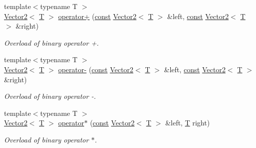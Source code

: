 \begin{DoxyCompactItemize}
{\footnotesize template$<$typename T $>$ }\\\hyperlink{classsf_1_1_vector2}{Vector2}$<$ \hyperlink{curses_8priv_8h_a5ef253115820acf7d27f3c5c3b02a0f0}{T} $>$ \hyperlink{classsf_1_1_vector2_a72421239823c38a6b780c86a710ead07}{operator+} (\hyperlink{term__entry_8h_a57bd63ce7f9a353488880e3de6692d5a}{const} \hyperlink{classsf_1_1_vector2}{Vector2}$<$ \hyperlink{curses_8priv_8h_a5ef253115820acf7d27f3c5c3b02a0f0}{T} $>$ \&left, \hyperlink{term__entry_8h_a57bd63ce7f9a353488880e3de6692d5a}{const} \hyperlink{classsf_1_1_vector2}{Vector2}$<$ \hyperlink{curses_8priv_8h_a5ef253115820acf7d27f3c5c3b02a0f0}{T} $>$ \&right)
\begin{DoxyCompactList}\small\item\em Overload of binary operator +. \end{DoxyCompactList}\item 
{\footnotesize template$<$typename T $>$ }\\\hyperlink{classsf_1_1_vector2}{Vector2}$<$ \hyperlink{curses_8priv_8h_a5ef253115820acf7d27f3c5c3b02a0f0}{T} $>$ \hyperlink{classsf_1_1_vector2_ad027adae53ec547a86c20deeb05c9e85}{operator-\/} (\hyperlink{term__entry_8h_a57bd63ce7f9a353488880e3de6692d5a}{const} \hyperlink{classsf_1_1_vector2}{Vector2}$<$ \hyperlink{curses_8priv_8h_a5ef253115820acf7d27f3c5c3b02a0f0}{T} $>$ \&left, \hyperlink{term__entry_8h_a57bd63ce7f9a353488880e3de6692d5a}{const} \hyperlink{classsf_1_1_vector2}{Vector2}$<$ \hyperlink{curses_8priv_8h_a5ef253115820acf7d27f3c5c3b02a0f0}{T} $>$ \&right)
\begin{DoxyCompactList}\small\item\em Overload of binary operator -\/. \end{DoxyCompactList}\item 
{\footnotesize template$<$typename T $>$ }\\\hyperlink{classsf_1_1_vector2}{Vector2}$<$ \hyperlink{curses_8priv_8h_a5ef253115820acf7d27f3c5c3b02a0f0}{T} $>$ \hyperlink{classsf_1_1_vector2_a5f48ca928995b41c89f155afe8d16b02}{operator$\ast$} (\hyperlink{term__entry_8h_a57bd63ce7f9a353488880e3de6692d5a}{const} \hyperlink{classsf_1_1_vector2}{Vector2}$<$ \hyperlink{curses_8priv_8h_a5ef253115820acf7d27f3c5c3b02a0f0}{T} $>$ \&left, \hyperlink{curses_8priv_8h_a5ef253115820acf7d27f3c5c3b02a0f0}{T} right)
\begin{DoxyCompactList}\small\item\em Overload of binary operator $\ast$. \end{DoxyCompactList}\item 

\end{DoxyCompactItemize}
